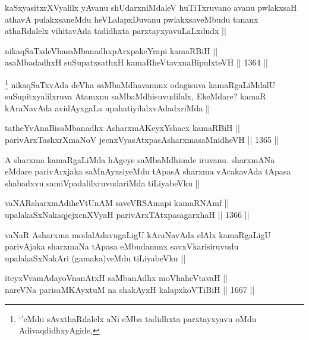 \begin{artha}
kaSxyasitxrXVyalilx yAvanu shUdarxniMdaleV huTiTxruvano avanu pwlakxsaH athavA pulakxsaneMdu heVLalapxDuvanu pwlakxsaveMbudu tananx athaRdalelx vihitavAda tadidhxta parxtayxyavuLaLxdudx ||
\end{artha}

\begin{shl}
nikaqSaTxdeVhasaMbanadhxpArxpakeYrapi kamaRBiH || \\
asaMbadadhxH suSupatxsathxH kamaRheVtavxnaBipulxteVH ||  1364 ||  
\end{shl}

\begin{artha}
\footnote{`\stext'eMdu sAvxthaRdalelx aNi eMba tadidhxta parxtayxyavu oMdu AdivaqdidhxyAgide,}
nikaqSaTxvAda deVha saMbaMdhavanunx odagisuva kamaRgaLiMdalU suSupitxyalilxruva Atamxnu saMbaMdhisuvudilalx, EkeMdare? kamaR kAraNavAda avidAyxgaLa upahatiyilalxvAdadxriMda || 
\end{artha}


\begin{shl}
tatheYvAnaBisaMbanadhx AsharxmAKeyxYshacx kamaRBiH || \\
parivArxTashxrXmaNoV jecnxVyasAtxpasAsharxmasaMnidheVH ||  1365 ||  
\end{shl}

\begin{artha}
A sharxma kamaRgaLiMda hAgeye saMbaMdhisade iruvanu. sharxmANa eMdare parivArxjaka saMnAyxsiyeMdu tApasA sharxma vAcakavAda tApasa shabadxvu samiVpadalilxruvudariMda tiLiyabeVku ||
\end{artha}

\begin{shl}
vaNARsharxmAdiheVtUnAM saveVRSAmapi kamaRNAmf || \\
upalakaSxNakaqjejxcnXVyaH parivArxTAtxpasagarxhaH || 1366 ||  
\end{shl}

\begin{artha}
vaNaR Asharxma modalAdavugaLigU kAraNavAda elAlx kamaRgaLigU parivAjaka sharxmaNa tApasa eMbudanunx savxVkarisiruvudu upalakaSxNakAri (gamaka)veMdu tiLiyabeVku ||
\end{artha}

\begin{shl}
iteyxVvamAdayoV\s nanAtxH saMbanAdhx moVhaheVtavaH || \\
nareVNa parisaMKAyxtuM na shakAyxH kalapxkoVTiBiH ||  1667 ||  
\end{shl}

